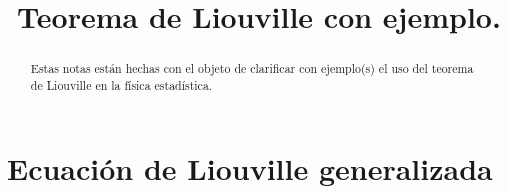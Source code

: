\documentclass[11pt,letterpaper]{article}
\begin{document}
\title{Teorema de Liouville con ejemplo.}
\maketitle

\begin{abstract}
Estas notas están hechas con el objeto de clarificar con ejemplo(s) el uso del teorema de Liouville en la física estadística.
\end{abstract}

\section{Ecuación de Liouville generalizada}
\end{document}
